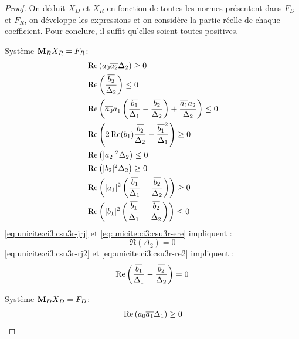 \begin{proof}
    On déduit \(X_D\) et \(X_R\) en fonction de toutes les normes présentent dans \(F_D\) et \(F_R\), on développe les expressions et on considère la partie réelle de chaque coefficient. Pour conclure, il suffit qu'elles soient toutes positives.

    \begin{minipage}{0.49\textwidth}
      {Système \(\mathbf{M}_RX_R=F_R\)}:
      \begin{align}
        \label{eq:unicite:ci3:csu3r-j2}&\operatorname{Re}\left(a_0{\overline{a_2}}\Delta_2\right) \ge 0 \\
        \label{eq:unicite:ci3:csu3r-e2}&\operatorname{Re}\left(\dfrac{{\overline{b_2}}}{\Delta_2}\right) \le 0 \\
        \label{eq:unicite:ci3:csu3r-jdj}&\operatorname{Re}\left({\overline{a_0}}a_1\left(\dfrac{{\overline{b_1}}}{\Delta_1}-\dfrac{{\overline{b_2}}}{\Delta_2}\right) + \dfrac{{\overline{a_1}}a_2}{\Delta_2} \right)\le 0\\
        \label{eq:unicite:ci3:csu3r-ede}&\operatorname{Re}\left(2\operatorname{Re}(b_1)\dfrac{{\overline{b_2}}}{\Delta_2}-\dfrac{{\overline{b_1}}^2}{\Delta_1}\right) \ge 0\\
        \label{eq:unicite:ci3:csu3r-jrj}&\operatorname{Re}\left(|a_2|^2\Delta_2\right) \le 0 \\
        \label{eq:unicite:ci3:csu3r-ere}&\operatorname{Re}\left(|b_2|^2\Delta_2\right) \ge 0 \\
        \label{eq:unicite:ci3:csu3r-rj2}&\operatorname{Re}\left(|a_1|^2\left(\dfrac{{\overline{b_1}}}{\Delta_1}-\dfrac{{\overline{b_2}}}{\Delta_2}\right)\right)\ge 0\\
        \label{eq:unicite:ci3:csu3r-re2}&\operatorname{Re}\left(|b_1|^2\left(\dfrac{{\overline{b_1}}}{\Delta_1}-\dfrac{{\overline{b_2}}}{\Delta_2}\right)\right)\le 0
      \end{align}
      \eqref{eq:unicite:ci3:csu3r-jrj} et \eqref{eq:unicite:ci3:csu3r-ere} impliquent :
      \begin{equation}
        \Re\left(\Delta_2\right) = 0
      \end{equation}
      \eqref{eq:unicite:ci3:csu3r-rj2} et \eqref{eq:unicite:ci3:csu3r-re2} impliquent :
      \begin{equation}
        \operatorname{Re}\left(\dfrac{{\overline{b_1}}}{\Delta_1}-\dfrac{{\overline{b_2}}}{\Delta_2}\right) = 0
      \end{equation}
    \end{minipage}
    \begin{minipage}{0.49\textwidth}
      {Système \(\mathbf{M}_DX_D=F_D\)}:
      \begin{align}
        \label{eq:unicite:ci3:csu3d-j2}&\Re\left(a_0\conj{a_1}\Delta_1\right) \ge 0 \\

\end{align}
\end{minipage}
\end{proof}
